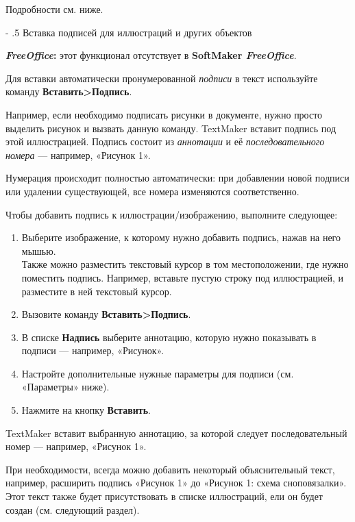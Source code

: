 ﻿\documentclass[a4paper,10pt]{article}
\makeatletter
\renewcommand\paragraph{%
   \@startsection{paragraph}{4}{0mm}%
      {-\baselineskip}%
      {.5\baselineskip}%
      {\normalfont\normalsize\bfseries}}
\makeatother
\begin{document}
 Подробности см. ниже.
 
 \paragraph{Вставка подписей для иллюстраций и других объектов}
 \begin{mdframed}[backgroundcolor=pink!50]
\textbf{\textit{FreeOffice}:} этот функционал отсутствует в \textbf{SoftMaker \textit{FreeOffice}}.
\end{mdframed}

Для вставки автоматически пронумерованной \textit{подписи} в текст используйте команду \textbf{Вставить>Подпись}.

Например, если необходимо подписать рисунки в документе, нужно просто выделить рисунок и вызвать данную команду. TextMaker вставит подпись под этой иллюстрацией. Подпись состоит из \textit{аннотации} и её \textit{последовательного номера} — например, «Рисунок 1».

Нумерация происходит полностью автоматически: при добавлении новой подписи или удалении существующей, все номера изменяются соответственно.

Чтобы добавить подпись к иллюстрации/изображению, выполните следующее:

\begin{enumerate}
 \item Выберите изображение, к которому нужно добавить подпись, нажав на него мышью.\\
 Также можно разместить текстовый курсор в том местоположении, где нужно поместить подпись. Например, вставьте пустую строку под иллюстрацией, и разместите в ней текстовый курсор.
 \item Вызовите команду \textbf{Вставить>Подпись}.
 \item В списке \textbf{Надпись} выберите аннотацию, которую нужно показывать в подписи — например, «Рисунок».
 \item Настройте дополнительные нужные параметры для подписи (см. «Параметры» ниже).
 \item Нажмите на кнопку \textbf{Вставить}.
\end{enumerate}

TextMaker вставит выбранную аннотацию, за которой следует последовательный номер — например, «Рисунок 1».

При необходимости, всегда можно добавить некоторый объяснительный текст, например, расширить подпись «Рисунок 1» до «Рисунок 1: схема сноповязалки». Этот текст также будет присутствовать в списке иллюстраций, ели он будет создан (см. следующий раздел).
\end{document}
